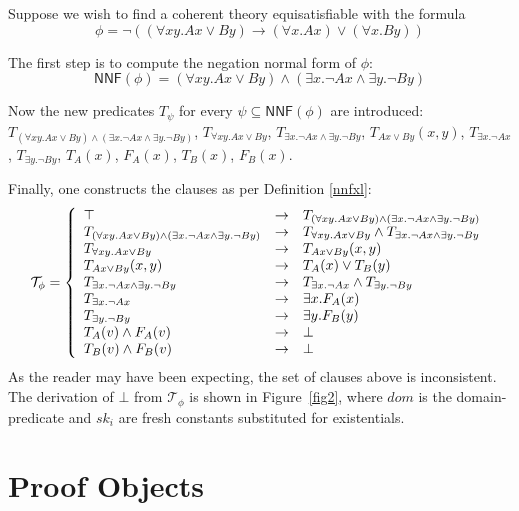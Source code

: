 \documentclass[a4paper,11pt]{article}
\newcommand{\nnf}[1]{\mathsf{NNF} #1}
\begin{document}
\begin{ex} \label{xlex}
Suppose we wish to find a coherent theory equisatisfiable with the formula
\[\phi = \lnot ((\forall x y. Ax \lor By) \to (\forall x. Ax) \lor (\forall x. By))\]

The first step is to compute the negation normal form of $\phi$:
\[\nnf(\phi) = (\forall x y. Ax \lor By) 
\land (\exists x. \lnot Ax \land \exists y. \lnot By)\]

Now the new predicates $T_\psi$ for every $\psi \subseteq \nnf(\phi)$ 
are introduced:\\
$T_{(\forall x y. Ax \lor By) \land (\exists x. \lnot Ax \land \exists y. \lnot By)}$,
$T_{\forall x y. Ax \lor By}$, $T_{\exists x. \lnot Ax \land \exists y. \lnot By}$,
$T_{Ax \lor By}(x,y)$, $T_{\exists x. \lnot Ax}$, $T_{\exists y. \lnot By}$,
$T_A(x)$, $F_A(x)$, $T_B(x)$, $F_B(x)$.

Finally, one constructs the clauses as per Definition \ref{nnfxl}:
\[
\mathcal T_\phi = \left\{
\begin{array}{l l l}
\top &\to &T_{(\forall x y. Ax \lor By) 
\land (\exists x. \lnot Ax \land \exists y. \lnot By)}\\
T_{(\forall x y. Ax \lor By) \land (\exists x. \lnot Ax \land \exists y. \lnot By)} &\to
&T_{\forall x y. Ax \lor By} \land T_{\exists x. \lnot Ax \land \exists y. \lnot By}\\
T_{\forall x y. Ax \lor By} &\to &T_{Ax \lor By}(x,y)\\
T_{Ax \lor By}(x,y) &\to &T_A(x) \lor T_B(y)\\
T_{\exists x. \lnot Ax \land \exists y. \lnot By}
&\to &T_{\exists x. \lnot Ax} \land T_{\exists y. \lnot By}\\
T_{\exists x. \lnot Ax} &\to &\exists x. F_A(x)\\
T_{\exists y. \lnot By} &\to &\exists y. F_B(y)\\
T_A(v) \land F_A(v) &\to &\bot\\
T_B(v) \land F_B(v) &\to &\bot\\
\end{array}
\right.
\]
As the reader may have been expecting, the set of clauses
above is inconsistent.  The derivation of $\bot$ from $\mathcal T_\phi$ is
shown in Figure~\ref{fig2}, where $\mathit{dom}$ is the domain-predicate
and $\mathit{sk_i}$ are fresh constants substituted for existentials.
\end{ex}

\newpage
\section{Proof Objects}
\end{document}

